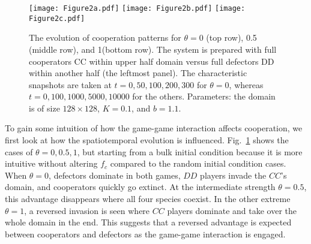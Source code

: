 \documentclass[doublecol]{epl2}
\begin{document}
\begin{figure}
\centering
\texttt{[image: Figure2a.pdf]}
\texttt{[image: Figure2b.pdf]}
\texttt{[image: Figure2c.pdf]}
\caption{
The evolution of cooperation patterns for $\theta=0$ (top row), 0.5 (middle row), and 1(bottom row). The system is prepared with full cooperators CC within upper half domain versus full defectors DD within another half (the leftmost panel). The characteristic snapshots are taken at $t=0,50,100,200,300$ for $\theta=0$, whereas $t=0,100,1000,5000,10000$ for the others.
Parameters: the domain is of size $128\times128$, $K=0.1$, and $b=1.1$.
}
\label{fig:pattern}
\end{figure}

To gain some intuition of how the game-game interaction affects cooperation, we first look at how the spatiotemporal evolution is influenced. Fig.~\ref{fig:pattern} shows the cases of $\theta=0,0.5,1$, but starting from a bulk initial condition because it is more intuitive without altering $f_c$ compared to the random initial condition cases. When $\theta=0$, defectors dominate in both games, $DD$ players invade the $CC$'s domain, and cooperators quickly go extinct.  At the intermediate strength $\theta=0.5$, this advantage disappears where all four species coexist. In the other extreme $\theta=1$, a reversed invasion is seen where $CC$ players dominate and take over the whole domain in the end. This suggests that a reversed advantage is expected between cooperators and defectors as the game-game interaction is engaged.
\end{document}
